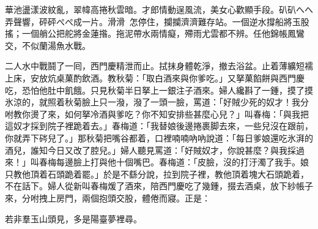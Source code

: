 \begin{myquote}
華池盪漾波紋亂，翠幃高捲秋雲暗。才郎情動逞風流，美女心歡顯手段。𥐙𥐙へへ弄聲響，砰砰ぺぺ成一片。滑滑𣺥𣺥怎停住，攔攔濟濟難存站。一個逆水撐船將玉股搖；一個艄公把舵將金蓮揝。拖泥帶水兩情癡，殢雨尤雲都不辨。任他錦帳鳳鸞交，不似蘭湯魚水戰。
\end{myquote}

二人水中戰鬪了一囘，西門慶精泄而止。拭抹身體乾淨，撤去浴盆。止着薄纊短襦上床，安放炕桌菓酌飲酒。教秋菊：「取白酒來與你爹吃。」又拏菓餡餅與西門慶吃，恐怕他肚中飢餓。只見秋菊半日拏上一銀注子酒來。婦人纔斟了一鍾，摸了摸氷涼的，就照着秋菊臉上只一潑，潑了一頭一臉，罵道：「好賊少死的奴才！我分咐教你燙了來，如何拏冷酒與爹吃？你不知安排些甚麼心兒？」叫春梅：「與我把這奴才採到院子裡跪着去。」春梅道：「我替娘後邊捲裹脚去來，一些兒沒在跟前，你就弄下硶兒了。」那秋菊把嘴谷都着，口裡喃喃吶吶說道：「每日爹娘還吃氷湃的酒兒，誰知今日又改了腔兒。」婦人聽見罵道：「好賊奴才，你說甚麼？與我採過來！」叫春梅每邊臉上打與他十個嘴巴。春梅道：「皮臉，沒的打汙濁了我手。娘只教他頂着石頭跪着罷。」於是不繇分說，拉到院子裡，教他頂着塊大石頭跪着，不在話下。婦人從新叫春梅煖了酒來，陪西門慶吃了幾鍾，掇去酒桌，放下紗帳子來，分咐拽上房門，兩個抱頭交股，體倦而寢。正是：

若非羣玉山頭見，多是陽臺夢裡尋。

